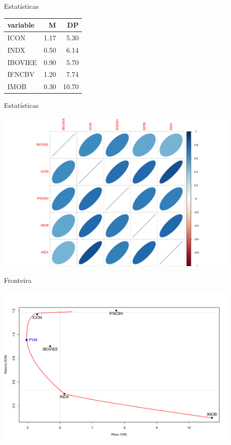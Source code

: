 \documentclass{beamer}
\begin{document}
\begin{frame}{Estatísticas}

\begin{table}[ht]
\centering
\begin{tabular}{lrr}
  \hline
variable & M & DP \\ 
  \hline
ICON & 1.17 & 5.30 \\ 
  INDX & 0.50 & 6.14 \\ 
  IBOVIEE & 0.90 & 5.70 \\ 
  IFNCBV & 1.20 & 7.74 \\ 
  IMOB & 0.30 & 10.70 \\ 
   \hline
\end{tabular}
\end{table}


\end{frame}


\begin{frame}{Estatísticas}

\begin{center}
 \includegraphics[height=8cm,keepaspectratio]{descritiva_cor.pdf}
 \end{center}


\end{frame}



\begin{frame}{Fronteira}

\begin{center}
 \includegraphics[height=8cm,keepaspectratio]{fronteira_ativos.pdf}
 \end{center}


\end{frame}
\end{document}
